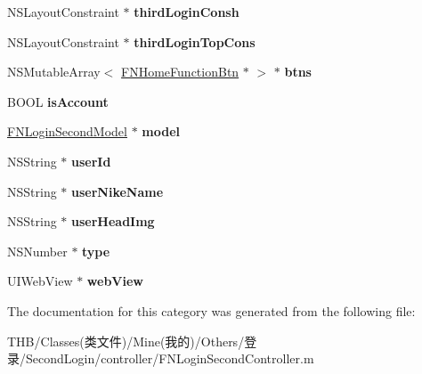 \begin{DoxyCompactItemize}
\mbox{\label{category_f_n_login_second_controller_07_08_a0ab4f1b92d775fb69377e1071ed0490a}} 
N\+S\+Layout\+Constraint $\ast$ {\bfseries third\+Login\+Consh}
\item 
\mbox{\label{category_f_n_login_second_controller_07_08_abfe3f25873eb092f2d13afc4ff5726f3}} 
N\+S\+Layout\+Constraint $\ast$ {\bfseries third\+Login\+Top\+Cons}
\item 
\mbox{\label{category_f_n_login_second_controller_07_08_ab07f5c754ff86b15e3b4536d6c6639fd}} 
N\+S\+Mutable\+Array$<$ \mbox{\hyperlink{interface_f_n_home_function_btn}{F\+N\+Home\+Function\+Btn}} $\ast$ $>$ $\ast$ {\bfseries btns}
\item 
\mbox{\label{category_f_n_login_second_controller_07_08_aaa424b34dcbd8e27279e7280125d63e9}} 
B\+O\+OL {\bfseries is\+Account}
\item 
\mbox{\label{category_f_n_login_second_controller_07_08_afa0f58777adc505c7714144fb7c619ce}} 
\mbox{\hyperlink{interface_f_n_login_second_model}{F\+N\+Login\+Second\+Model}} $\ast$ {\bfseries model}
\item 
\mbox{\label{category_f_n_login_second_controller_07_08_abba1b4b0895dc864cad34c29ee86f675}} 
N\+S\+String $\ast$ {\bfseries user\+Id}
\item 
\mbox{\label{category_f_n_login_second_controller_07_08_a08879044692d4efb10de1411b7ace750}} 
N\+S\+String $\ast$ {\bfseries user\+Nike\+Name}
\item 
\mbox{\label{category_f_n_login_second_controller_07_08_a1a019c5da0b21ea62e569d38e4545230}} 
N\+S\+String $\ast$ {\bfseries user\+Head\+Img}
\item 
\mbox{\label{category_f_n_login_second_controller_07_08_a9fc093200a2086f5c17884ca54476b85}} 
N\+S\+Number $\ast$ {\bfseries type}
\item 
\mbox{\label{category_f_n_login_second_controller_07_08_ab1066ae67139b6f7a914cd950767975f}} 
U\+I\+Web\+View $\ast$ {\bfseries web\+View}
\end{DoxyCompactItemize}


The documentation for this category was generated from the following file\+:\begin{DoxyCompactItemize}
\item 
T\+H\+B/\+Classes(类文件)/\+Mine(我的)/\+Others/登录/\+Second\+Login/controller/F\+N\+Login\+Second\+Controller.\+m\end{DoxyCompactItemize}
